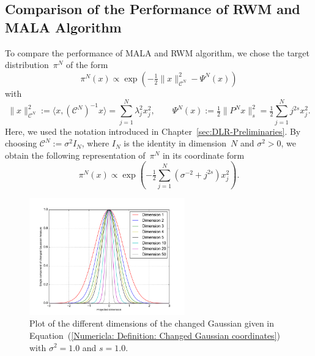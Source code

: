 \subsection{Comparison of the Performance of RWM and MALA Algorithm}
\label{sec:sub:Numericals: Comparison MALA - RWM}

To compare the performance of MALA and RWM algorithm, we chose the target distribution~$\pi^N$ of the form
\begin{equation}
 \label{Numerical: Definition: Changed Gaussian}
 \pi^N (x) \varpropto \exp \left(- \tfrac{1}{2} \| x \|_{\mathcal{C}^N}^2 - \Psi^N (x) \right)
\end{equation}
with
\begin{equation}
 \label{Numerical: Definition: Psi^N and C^N}
 \| x \|_{\mathcal{C}^N}^2 := \langle x, (\mathcal{C}^N)^{-1}x \rangle = \sum_{j=1}^N \lambda_j^2 x_j^2, \qquad \Psi^N (x) := \tfrac{1}{2} \|P^N x \|^2_{s}=\tfrac{1}{2} \sum_{j=1}^{N} j^{2s}x_j^2.
\end{equation}
Here, we used the notation introduced in Chapter~\ref{sec:DLR-Preliminaries}. By choosing $\mathcal{C}^N := \sigma^2 I_N$, where $I_N$ is the identity in dimension~$N$ and $\sigma^2>0$, we obtain the following representation of~$\pi^N$ in its coordinate form
\begin{equation}
\label{Numericla: Definition: Changed Gaussian coordinates}
 \pi^N (x) \varpropto \exp \left( -\tfrac{1}{2} \sum_{j=1}^N ( \sigma^{-2} + j^{2s}) x_j^2   \right).
\end{equation}

\begin{figure}%
 \begin{center} 
  \includegraphics[width=0.60\textwidth]{figure_ChangedGaussian}
 \end{center}
  \caption{Plot of the different dimensions of the changed Gaussian given in Equation~(\ref{Numericla: Definition: Changed Gaussian coordinates}) with $\sigma^2 = 1.0$ and $s = 1.0$.}
  \label{fig:target: Changed Gaussian}
\end{figure}

